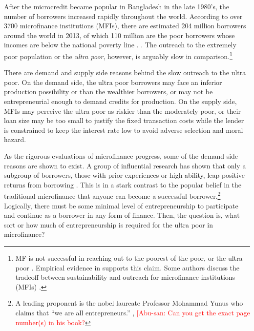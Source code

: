 	After the microcredit became popular in Bangladesh in the late 1980's, the number of borrowers increased rapidly throughout the world. According to over 3700 microfinance institutions (MFIs), there are estimated 204 million borrowers around the world in 2013, of which 110 million are the poor borrowers whose incomes are below the national poverty line \citep{MFGateway2015}.  \citep{Tolzmann2022}.  The outreach to the extremely poor population or the \textit{ultra poor}, however, is arguably slow in comparison.\footnote{MF is not successful in reaching out to the poorest of the poor, or the ultra poor \citep[][]{Scully2004}. Empirical evidence in \citet{Yaron1994, Navajas2000, RahmanRazzaque2000, AghionMorduch2007} supports this claim. Some authors discuss the tradeoff between sustainability and outreach for microfinance institutions (MFIs) \citet{HermesLensink2011, HermesLensinkMeesters2011, Cull2011}. } 

	There are demand and supply side reasons behind the slow outreach to the ultra poor. On the demand side, the ultra poor borrowers may face an inferior production possibility or  than the wealthier borrowers, or may not be entrepreneurial enough to demand credits for production. On the supply side, MFIs may perceive the ultra poor as riskier than the moderately poor, or their loan size may be too small to justify the fixed transaction costs while the lender is constrained to keep the interest rate low to avoid adverse selection and moral hazard. 

	As the rigorous evaluations of microfinance progress, some of the demand side reasons are shown to exist. A group of influential research has shown that only a subgroup of borrowers, those with prior experiences or high ability, leap positive returns from borrowing \citep{Banerjee2015Miracle, Mckenzie2017Spurring, Banerjee2019MFPovertyTrap, BueraKaboskiShin2020}. This is in a stark contrast to the popular belief in the traditional microfinance that anyone can become a successful borrower.\footnote{A leading proponent is the nobel laureate Professor Mohammad Yunus who claims that ``we are all entrepreneurs.'' \citep{Yunus2003}, \citep{Cosic2017} \textcolor{red}{[Abu-san: Can you get the exact page number(s) in his book?} } Logically, there must be some minimal level of entrepreneurship to participate and continue as a borrower in any form of finance. Then, the question is, what sort or how much of entrepreneurship is required for the ultra poor in microfinance? 


